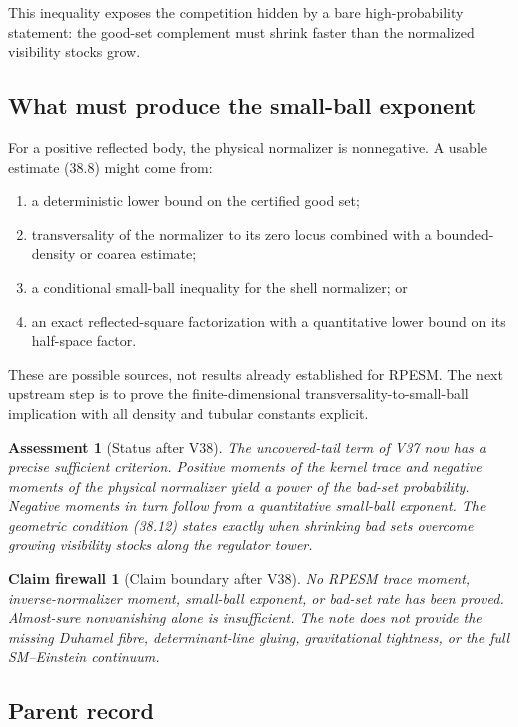 \documentclass[11pt]{article}
\newtheorem{firewall}[theorem]{Claim firewall}
\newtheorem{assessment}[theorem]{Assessment}
\theoremstyle{remark}
\begin{document}
This inequality exposes the competition hidden by a bare
high-probability statement: the good-set complement must shrink
faster than the normalized visibility stocks grow.

\subsection{What must produce the small-ball exponent}

For a positive reflected body, the physical normalizer is
nonnegative.  A usable estimate (38.8) might come from:
\begin{enumerate}
\item a deterministic lower bound on the certified good set;
\item transversality of the normalizer to its zero locus combined
with a bounded-density or coarea estimate;
\item a conditional small-ball inequality for the shell normalizer;
or
\item an exact reflected-square factorization with a quantitative
lower bound on its half-space factor.
\end{enumerate}
These are possible sources, not results already established for
RPESM.  The next upstream step is to prove the finite-dimensional
transversality-to-small-ball implication with all density and
tubular constants explicit.

\begin{assessment}[Status after V38]
\label{ass:v12v38-status}
The uncovered-tail term of V37 now has a precise sufficient
criterion.  Positive moments of the kernel trace and negative
moments of the physical normalizer yield a power of the bad-set
probability.  Negative moments in turn follow from a quantitative
small-ball exponent.  The geometric condition (38.12) states exactly
when shrinking bad sets overcome growing visibility stocks along the
regulator tower.
\end{assessment}

\begin{firewall}[Claim boundary after V38]
\label{fire:v12v38-claim}
No RPESM trace moment, inverse-normalizer moment, small-ball exponent,
or bad-set rate has been proved.  Almost-sure nonvanishing alone is
insufficient.  The note does not provide the missing Duhamel fibre,
determinant-line gluing, gravitational tightness, or the full
SM--Einstein continuum.
\end{firewall}

\subsection{Parent record}
\end{document}
